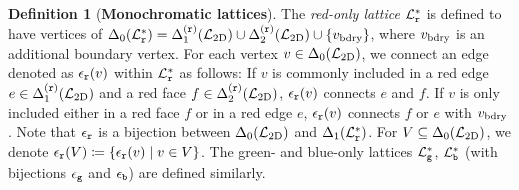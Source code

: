 \documentclass[a4paper,twocolumn,11pt,accepted=2025-01-21]{quantumarticle}
\theoremstyle{definition}
\theoremstyle{definition}
\newtheorem{definition}{Definition}
\theoremstyle{definition}
\begin{document}
\begin{definition}[\textbf{Monochromatic lattices}]
    The \emph{red-only lattice} $\mathcal{L}_{\texttt{r}}^*$ is defined to have vertices of $\Delta_{0}\qty(\mathcal{L}_{\texttt{r}}^*) = \Delta_{1}^{(\texttt{r})}\qty(\mathcal{L}_{\mathrm{2D}}) \cup \Delta_{2}^{(\texttt{r})}\qty(\mathcal{L}_{\mathrm{2D}}) \cup \qty{v_{\mathrm{bdry}}}$, where $v_{\mathrm{bdry}}$ is an additional boundary vertex. 
    For each vertex $v \in \Delta_{0}\qty(\mathcal{L}_{\mathrm{2D}})$, we connect an edge denoted as $\epsilon_{\texttt{r}}(v)$ within $\mathcal{L}_{\texttt{r}}^*$ as follows:
    If $v$ is commonly included in a red edge $e \in \Delta_{1}^{(\texttt{r})}\qty(\mathcal{L}_{\mathrm{2D}})$ and a red face $f \in \Delta_{2}^{(\texttt{r})}\qty(\mathcal{L}_{\mathrm{2D}})$, $\epsilon_{\texttt{r}}(v)$ connects $e$ and $f$.
    If $v$ is only included either in a red face $f$ or in a red edge $e$, $\epsilon_{\texttt{r}}(v)$ connects $f$ or $e$ with $v_{\mathrm{bdry}}$.
    Note that $\epsilon_{\texttt{r}}$ is a bijection between $\Delta_{0}\qty(\mathcal{L}_{\mathrm{2D}})$ and $\Delta_{1}\qty(\mathcal{L}_{\texttt{r}}^*)$.
    For $V \subseteq \Delta_{0}\qty(\mathcal{L}_{\mathrm{2D}})$, we denote $\epsilon_{\texttt{r}}(V) \coloneqq \qty{ \epsilon_{\texttt{r}}(v) \mid v \in V}$.
    The green- and blue-only lattices $\mathcal{L}_{\texttt{g}}^*$, $\mathcal{L}_{\texttt{b}}^*$ (with bijections $\epsilon_{\texttt{g}}$ and $\epsilon_{\texttt{b}}$) are defined similarly.
    \label{def:monochromatic_lattices}
\end{definition}
\end{document}
